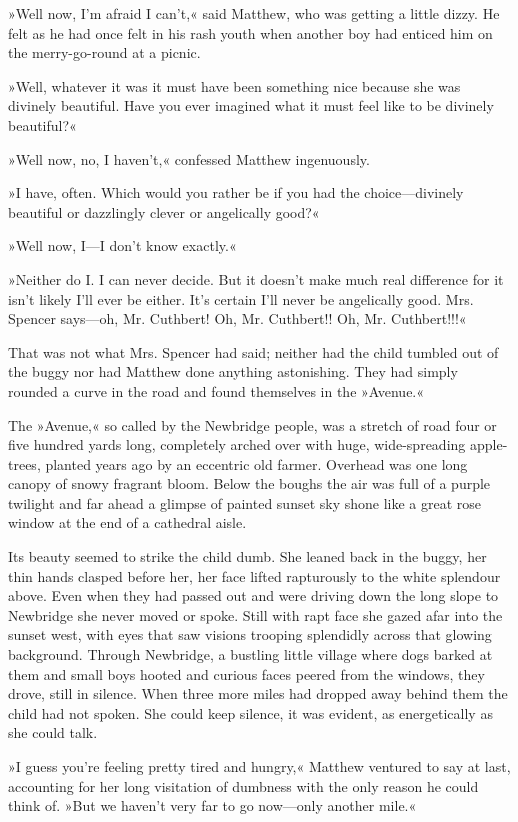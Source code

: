 »Well now, I’m afraid I can’t,« said Matthew, who was getting a little dizzy. He felt as he had once felt in his rash youth when another boy had enticed him on the merry-go-round at a picnic.

»Well, whatever it was it must have been something nice because she was divinely beautiful. Have you ever imagined what it must feel like to be divinely beautiful?«

»Well now, no, I haven’t,« confessed Matthew ingenuously.

»I have, often. Which would you rather be if you had the choice—divinely beautiful or dazzlingly clever or angelically good?«

»Well now, I—I don’t know exactly.«

»Neither do I. I can never decide. But it doesn’t make much real difference for it isn’t likely I’ll ever be either. It’s certain I’ll never be angelically good. Mrs. Spencer says—oh, Mr. Cuthbert! Oh, Mr. Cuthbert!! Oh, Mr. Cuthbert!!!«

That was not what Mrs. Spencer had said; neither had the child tumbled out of the buggy nor had Matthew done anything astonishing. They had simply rounded a curve in the road and found themselves in the »Avenue.«

The »Avenue,« so called by the Newbridge people, was a stretch of road four or five hundred yards long, completely arched over with huge, wide-spreading apple-trees, planted years ago by an eccentric old farmer. Overhead was one long canopy of snowy fragrant bloom. Below the boughs the air was full of a purple twilight and far ahead a glimpse of painted sunset sky shone like a great rose window at the end of a cathedral aisle.

Its beauty seemed to strike the child dumb. She leaned back in the buggy, her thin hands clasped before her, her face lifted rapturously to the white splendour above. Even when they had passed out and were driving down the long slope to Newbridge she never moved or spoke. Still with rapt face she gazed afar into the sunset west, with eyes that saw visions trooping splendidly across that glowing background. Through Newbridge, a bustling little village where dogs barked at them and small boys hooted and curious faces peered from the windows, they drove, still in silence. When three more miles had dropped away behind them the child had not spoken. She could keep silence, it was evident, as energetically as she could talk.

»I guess you’re feeling pretty tired and hungry,« Matthew ventured to say at last, accounting for her long visitation of dumbness with the only reason he could think of. »But we haven’t very far to go now—only another mile.«

